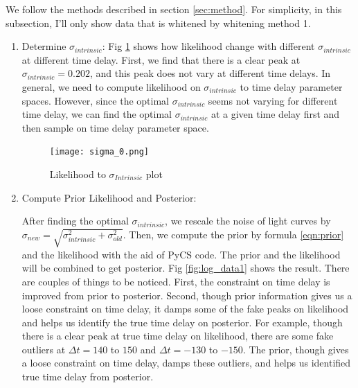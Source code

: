 \documentclass[\docopts]{\docclass}
\begin{document}
We follow the methods described in section \ref{sec:method}.  For simplicity, in this subsection, I'll only show data that is whitened by whitening method 1.
\begin{enumerate}
\item Determine $\sigma_{intrinsic}$:
Fig \ref{fig:sigma1} shows how likelihood change with different $\sigma_{intrinsic}$ at different time delay. First, we find that there is a clear peak at $\sigma_{intrinsic}=0.202$, and this peak does not vary at different time delays. In general, we need to compute likelihood on $\sigma_{intrinsic}$ to time delay parameter spaces. However, since the optimal $\sigma_{intrinsic}$ seems not varying for different time delay, we can find the optimal $\sigma_{intrinsic}$ at a given time delay first and then sample on time delay parameter space.

\begin{figure}[!h]
\texttt{[image: sigma\_0.png]}
\caption{Likelihood to $\sigma_{Intrinsic}$ plot}
\label{fig:sigma1}
\end{figure}

\item Compute Prior Likelihood and Posterior:

After finding the optimal $\sigma_{intrinsic}$, we rescale the noise of light curves by $\sigma_{new}=\sqrt{\sigma_{intrinsic}^2+\sigma_{old}^2}$. Then, we compute the prior by formula \ref{eqn:prior} and the likelihood with the aid of PyCS code. The prior and the likelihood will be combined to get posterior. Fig \ref{fig:log_data1} shows the result.  There are couples of things to be noticed. First, the constraint on time delay is improved from prior to posterior. Second, though prior information gives us a loose constraint on time delay, it damps some of the fake peaks on likelihood and helps us identify the true time delay on posterior. For example, though there is a clear peak at true time  delay on likelihood, there are some fake outliers at  $\Delta t =140$ to $150$ and $\Delta t =-130$ to $-150$. The prior, though gives a loose constraint on time delay, damps these outliers, and helps us identified true time delay from posterior.


\end{enumerate}
\end{document}
